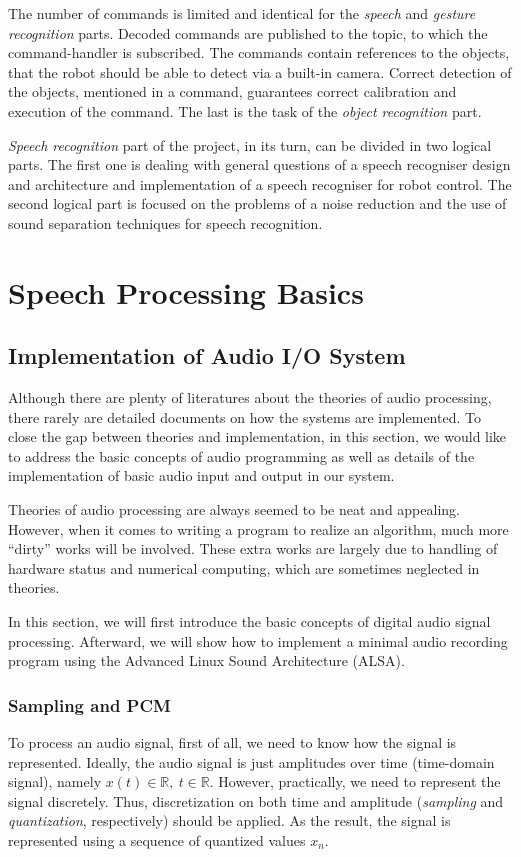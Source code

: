 \documentclass[11pt,a4paper]{report}
\begin{document}
 
The number of commands is limited and identical for the \textit
{speech} and \textit {gesture recognition} parts. Decoded commands are published
to the topic, to which the command-handler is subscribed.  The commands 
contain references to the objects, that the robot should be able to detect via
a built-in camera. Correct detection of the objects, mentioned in a command,
guarantees correct calibration and execution of the command. The last is the task of the \textit {object recognition} part. 

 \textit {Speech recognition} part of the project, in its turn,
can be divided in two logical parts. The first one is dealing with general questions of
a speech recogniser design and architecture and implementation of a speech
recogniser for robot control. The second logical part is focused on the
problems of a noise reduction and the use of sound separation techniques for
speech recognition. 


\chapter{Speech Processing Basics}

\section{Implementation of Audio I/O System}
Although there are plenty of literatures about the theories of audio processing, there rarely are detailed documents on how the systems are implemented. To close the gap between theories and implementation, in this section, we would like to address the basic concepts of audio programming as well as details of the implementation of basic audio input and output in our system.

Theories of audio processing are always seemed to be neat and appealing. However, when it comes to writing a program to realize an algorithm, much more ``dirty'' works will be involved. These extra works are largely due to handling of hardware status and numerical computing, which are sometimes neglected in theories.

In this section, we will first introduce the basic concepts of digital audio signal processing. Afterward, we will show how to implement a minimal audio recording program using the Advanced Linux Sound Architecture (ALSA).

\subsection{Sampling and PCM}
To process an audio signal, first of all, we need to know how the signal is represented. Ideally, the audio signal is just amplitudes over time (time-domain signal), namely $ x(t) \in \mathbb{R},~ t \in \mathbb{R} $. However, practically, we need to represent the signal discretely. Thus, discretization on both time and amplitude (\textit{sampling} and \textit{quantization}, respectively) should be applied. As the result, the signal is represented using a sequence of quantized values $x_n$.
\end{document}
